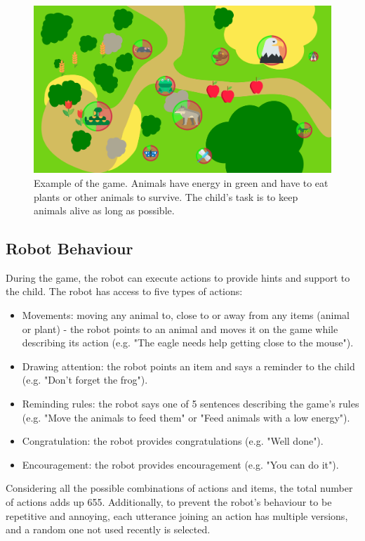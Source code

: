 \begin{figure}[ht]
	\centering
		\includegraphics[width=1\textwidth]{game.png}
		\caption{Example of the game. Animals have energy in green and have to eat plants or other animals to survive. The child's task is to keep animals alive as long as possible.}
		\label{fig:tutoring_game}
\end{figure}

\subsection{Robot Behaviour}
 
During the game, the robot can execute actions to provide hints and support to the child. The robot has access to five types of actions:
\begin{itemize}
	\item Movements: moving any animal to, close to or away from any items (animal or plant) - the robot points to an animal and moves it on the game while describing its action (e.g. "The eagle needs help getting close to the mouse").
	\item Drawing attention: the robot points an item and says a reminder to the child (e.g. "Don't forget the frog").
	\item Reminding rules: the robot says one of 5 sentences describing the game's rules (e.g. "Move the animals to feed them" or "Feed animals with a low energy").
	\item Congratulation: the robot provides congratulations (e.g. "Well done").
	\item Encouragement: the robot provides encouragement (e.g. "You can do it").
\end{itemize}
Considering all the possible combinations of actions and items, the total number of actions adds up 655. Additionally, to prevent the robot's behaviour to be repetitive and annoying, each utterance joining an action has multiple versions, and a random one not used recently is selected. 

